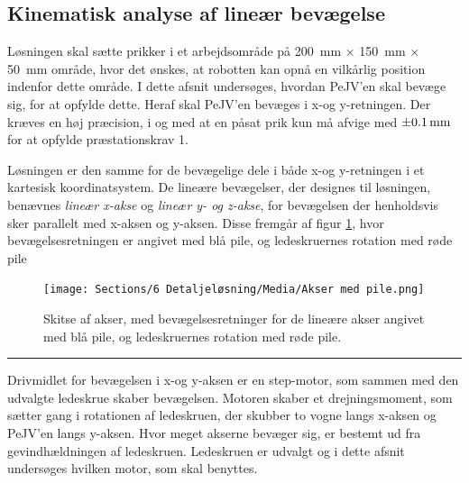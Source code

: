 
\subsection{Kinematisk analyse af lineær bevægelse} \label{Kinematisk analyse}
Løsningen skal sætte prikker i et arbejdsområde på \SI{200}{mm} \(\times\) \SI{150}{mm} \(\times\) \SI{50}{mm} område, hvor det ønskes, at robotten kan opnå en vilkårlig position indenfor dette område. I dette afsnit undersøges, hvordan PeJV'en skal bevæge sig, for at opfylde dette. Heraf skal PeJV'en bevæges i x-og y-retningen. Der kræves en høj præcision, i og med at en påsat prik kun må afvige med $\SI{\pm0,1}{mm}$ for at opfylde præstationskrav 1.

Løsningen er den samme for de bevægelige dele i både x-og y-retningen i et kartesisk koordinatsystem. De lineære bevægelser, der designes til løsningen, benævnes \textit{ lineær x-akse} og \textit{lineær y- og z-akse}, for bevægelsen der henholdsvis sker parallelt med x-aksen og y-aksen. Disse fremgår af figur \ref{Skite af akser med pile}, hvor bevægelsesretningen er angivet med blå pile, og ledeskruernes rotation med røde pile

\begin{figure}[H]
    \centering
    \texttt{[image: Sections/6 Detaljeløsning/Media/Akser med pile.png]}
    \caption{Skitse af akser, med bevægelsesretninger for de lineære akser angivet med blå pile, og ledeskruernes rotation med røde pile.}
    \label{Skite af akser med pile}
\end{figure} \plainbreak{-.5}

Drivmidlet for bevægelsen i x-og y-aksen er en step-motor, som sammen med den udvalgte ledeskrue skaber bevægelsen. Motoren skaber et drejningsmoment, som sætter gang i rotationen af ledeskruen, der skubber to vogne langs x-aksen og PeJV'en langs y-aksen. Hvor meget akserne bevæger sig, er bestemt ud fra gevindhældningen af ledeskruen. Ledeskruen er udvalgt og i dette afsnit undersøges hvilken motor, som skal benyttes.



